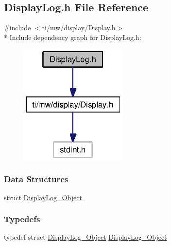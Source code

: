 \subsection{Display\+Log.\+h File Reference}
\label{_display_log_8h}
{\ttfamily \#include $<$ti/mw/display/\+Display.\+h$>$}\\*
Include dependency graph for Display\+Log.\+h\+:
\nopagebreak
\begin{figure}[H]
\begin{center}
\leavevmode
\includegraphics[width=153pt]{_display_log_8h__incl}
\end{center}
\end{figure}
\subsubsection*{Data Structures}
\begin{DoxyCompactItemize}
\item 
struct \hyperlink{struct_display_log___object}{Display\+Log\+\_\+\+Object}
\end{DoxyCompactItemize}
\subsubsection*{Typedefs}
\begin{DoxyCompactItemize}
\item 
typedef struct \hyperlink{struct_display_log___object}{Display\+Log\+\_\+\+Object} \hyperlink{_display_log_8h_a4145e66a371835b4c60f09d8428f04a3}{Display\+Log\+\_\+\+Object}
\end{DoxyCompactItemize}
